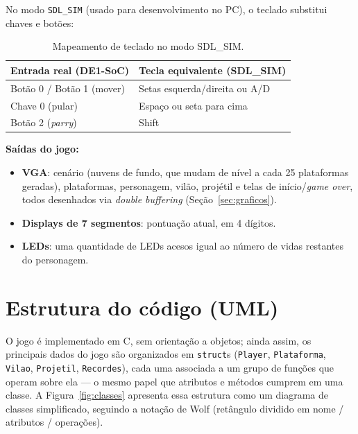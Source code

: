 \documentclass[a4paper,12pt]{article}
\newcommand{\code}[1]{\texttt{#1}}
\begin{document}
No modo \code{SDL\_SIM} (usado para desenvolvimento no PC), o teclado substitui
chaves e botões:

\begin{table}[H]
    \centering
    \small
    \begin{tabular}{@{}ll@{}}
        \toprule
        \textbf{Entrada real (DE1-SoC)} & \textbf{Tecla equivalente (SDL\_SIM)} \\
        \midrule
        Botão 0 / Botão 1 (mover) & Setas esquerda/direita ou A/D \\
        Chave 0 (pular) & Espaço ou seta para cima \\
        Botão 2 (\emph{parry}) & Shift \\
        \bottomrule
    \end{tabular}
    \caption{Mapeamento de teclado no modo SDL\_SIM.}
\end{table}

\textbf{Saídas do jogo:}
\begin{itemize}
    \item \textbf{VGA}: cenário (nuvens de fundo, que mudam de nível a cada 25
    plataformas geradas), plataformas, personagem, vilão, projétil e telas de
    início/\emph{game over}, todos desenhados via \emph{double buffering}
    (Seção~\ref{sec:graficos}).
    \item \textbf{Displays de 7 segmentos}: pontuação atual, em 4 dígitos.
    \item \textbf{LEDs}: uma quantidade de LEDs acesos igual ao número de
    vidas restantes do personagem.
\end{itemize}

\section{Estrutura do código (UML)}
\label{sec:uml}

O jogo é implementado em C, sem orientação a objetos; ainda assim, os
principais dados do jogo são organizados em \code{struct}s (\code{Player},
\code{Plataforma}, \code{Vilao}, \code{Projetil}, \code{Recordes}), cada uma
associada a um grupo de funções que operam sobre ela --- o mesmo papel que
atributos e métodos cumprem em uma classe. A Figura~\ref{fig:classes}
apresenta essa estrutura como um diagrama de classes simplificado, seguindo a
notação de Wolf (retângulo dividido em nome / atributos / operações).
\end{document}
